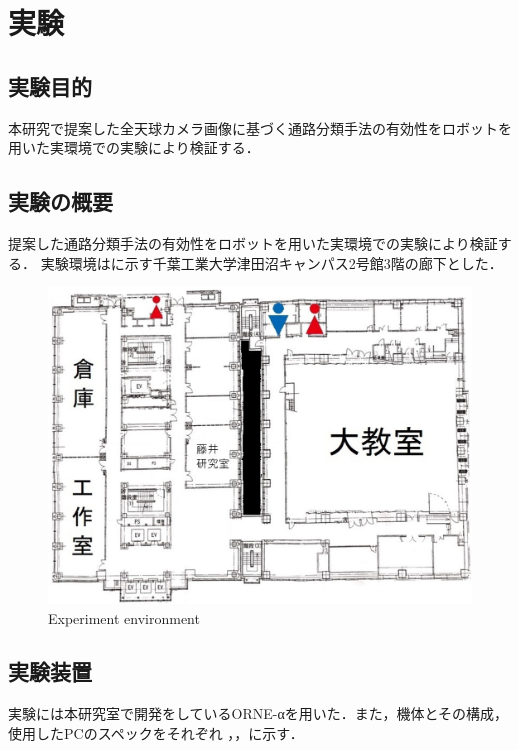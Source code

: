\documentclass[../main]{subfiles}
\begin{document}
\setcounter{secnumdepth}{3}
    \chapter{実験}
    \section{実験目的}
        本研究で提案した全天球カメラ画像に基づく通路分類手法の有効性をロボットを用いた実環境での実験により検証する．
    \section{実験の概要}
        提案した通路分類手法の有効性をロボットを用いた実環境での実験により検証する．
        実験環境はに示す千葉工業大学津田沼キャンパス2号館3階の廊下とした．
        \begin{figure}[H]
         \centering
         \includegraphics[width=12cm]{../images/MAP_Tsudanuma2-3.png}
         \caption{Experiment environment}
         \label{figure::3floor_map}
        \end{figure}

    \section{実験装置}
        実験には本研究室で開発をしているORNE-αを用いた．また，機体とその構成，使用したPCのスペックをそれぞれ
        ，，に示す．
\end{document}
